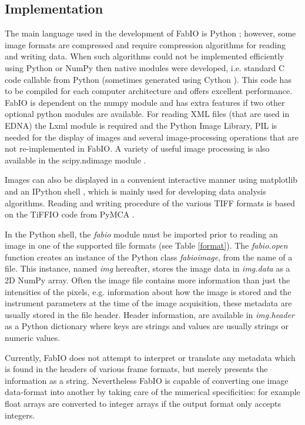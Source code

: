 \documentclass[preprint ]{iucr}
\begin{document}
\subsection{Implementation}
The main language used in the development of FabIO is Python \cite{python};
however, some image formats are compressed and require
compression algorithms for reading and writing data. 
When such algorithms could not be implemented efficiently using Python or NumPy 
then native modules were developed, i.e. standard C code callable from Python 
(sometimes generated using Cython \cite{cython}).
This code has to be compiled for each computer architecture and offers 
excellent performance.
FabIO is dependent on the numpy module and has extra features if two other
optional python modules are available. 
For reading XML files (that are used in EDNA) the Lxml module is required 
and the Python Image Library, PIL \cite{pil} is needed for the display of 
images and several image-processing operations that are not re-implemented 
in FabIO.
A variety of useful image processing is also available in the scipy.ndimage 
module \cite{scipy}.


Images can also be displayed in a convenient interactive manner using
matplotlib \cite{matplotlib} and an IPython shell \cite{ipython}, which is
mainly used for developing data analysis algorithms.
Reading and writing procedure of the various TIFF \cite{tiff} formats is based
on the TiFFIO code from PyMCA \cite{pymca}.

In the Python shell, the {\em fabio} module must be imported prior to reading an
image in one of the supported file formats (see Table \ref{format}).
The {\em fabio.open} function creates an instance of the Python class {\em fabioimage},
from the name of a file. This instance, named {\em img} hereafter, stores the
image data in {\em img.data} as a 2D NumPy array. Often the image file contains
more information than just the intensities of the pixels, e.g.
information about how the image is stored and the instrument parameters at the
time of the image acquisition, these metadata are usually stored in
the file header.
Header information, are available in {\em img.header} as a Python
dictionary where keys are strings and values are usually strings or
numeric values.

Currently, FabIO does not attempt to interpret or translate any metadata which
is found in the headers of various frame formats, but merely presents the
information as a string. Nevertheless FabIO is capable of converting one
image data-format into another by taking care of the numerical specificities: 
for example float arrays are converted to integer arrays if the output format only
accepts integers.
\end{document}
